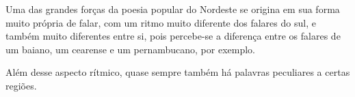 Uma das grandes forças da poesia popular do Nordeste se origina em sua
forma muito própria de falar, com um ritmo muito diferente dos falares
do sul, e também muito diferentes entre si, pois percebe-se a diferença
entre os falares de um baiano, um cearense e um pernambucano, por
exemplo.

Além desse aspecto rítmico, quase sempre também há palavras peculiares a
certas regiões. 
%
%
%
%
%
